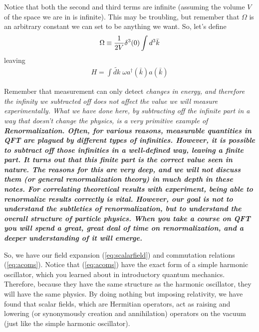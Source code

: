 \documentclass[12pt,epsf]{article}
\def\nolabel{\nonumber }
\def\nolabel{\nonumber }
\begin{document}
Notice that both the second and third terms are infinite (assuming the
volume $V$ of the space we are in is infinite).  This may be troubling,
but remember that $\Omega$ is an arbitrary constant we can set to be
anything we want.  So, let's define
\begin{eqnarray}
\Omega \equiv {1\over 2V} \delta^3(0) \int d^3 \bar k\nolabel
\end{eqnarray}
leaving
\begin{eqnarray}
H = \int \widetilde{dk} \; \omega a^{\dagger} (\bar k ) a (\bar k )
\label{eq:scalarhamiltonian}
\end{eqnarray}

Remember that measurement can only detect \it changes \rm in energy,
and therefore the infinity we subtracted off does not affect the value
we will measure experimentally.  What we have done here, by subtracting
off the infinite part in a way that doesn't change the physics, is a
very primitive example of \bf Renormalization\rm.  Often, for various
reasons, measurable quantities in QFT are plagued by different types
of infinities.	However, it is possible to subtract off those
infinities in a well-defined way, leaving a finite part.  It turns out
that this finite part is the correct value seen in nature.  The reasons
for this are very deep, and we will not discuss them (or general
renormalization theory) in much depth in these notes.  For correlating
theoretical results with experiment, being able to renormalize results
correctly is vital.  However, our goal is not to understand the
subtleties of renormalization, but to understand the overall structure
of particle physics.  When you take a course on QFT you will spend a
great, great deal of time on renormalization, and a deeper
understanding of it will emerge.  

So, we have our field expansion (\ref{eq:scalarfield}) and commutation
relations (\ref{eq:acoms}).  Notice that (\ref{eq:acoms}) have the
exact form of a simple harmonic oscillator, which you learned about in
introductory quantum mechanics.  Therefore, because they have the same
structure as the harmonic oscillator, they will have the same physics. 
By doing nothing but imposing relativity, we have found that scalar
fields, which are Hermitian operators, act as raising and lowering (or
synonymously creation and annihilation) operators on the vacuum (just
like the simple harmonic oscillator).  
\end{document}
